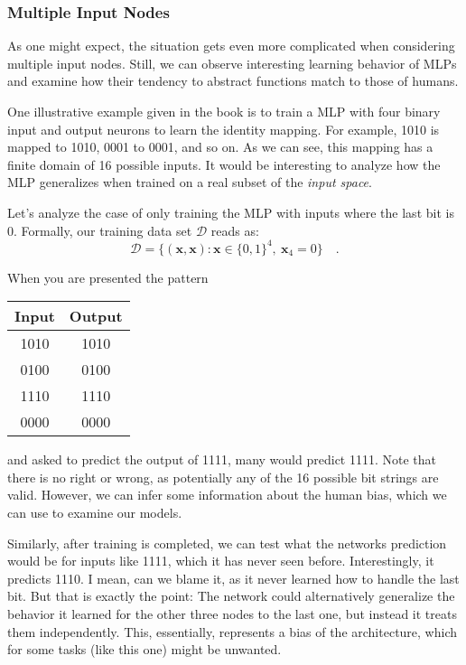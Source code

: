 \documentclass[../../main.tex]{subfiles}
\begin{document}
    \subsubsection{Multiple Input Nodes}
    As one might expect, the situation gets even more complicated when considering multiple input nodes. Still, we can observe interesting learning behavior of MLPs and examine how their tendency to abstract functions match to those of humans.

    One illustrative example given in the book is to train a MLP with four binary input and output neurons to learn the identity mapping. For example, 1010 is mapped to 1010, 0001 to 0001, and so on. As we can see, this mapping has a finite domain of 16 possible inputs. It would be interesting to analyze how the MLP generalizes when trained on a real subset of the \emph{input space}.

    Let's analyze the case of only training the MLP with inputs where the last bit is 0. Formally, our training data set $\mathcal{D}$ reads as:
    \[
        \mathcal{D} = \{ (\bm{x}, \bm{x}): \bm{x} \in \{0, 1\}^4, \ \bm{x}_4 = 0 \} \quad .
    \]

    \begin{example}
        When you are presented the pattern

        \begin{table}[h]
            \centering
            \begin{tabular}{c|c}
                Input & Output \\
                \hline
                1010 & 1010 \\
                0100 & 0100 \\
                1110 & 1110 \\
                0000 & 0000 \\
            \end{tabular}
        \end{table}
        and asked to predict the output of 1111, many would predict 1111. Note that there is no right or wrong, as potentially any of the 16 possible bit strings are valid. However, we can infer some information about the human bias, which we can use to examine our models.
    \end{example}

    Similarly, after training is completed, we can test what the networks prediction would be for inputs like 1111, which it has never seen before. Interestingly, it predicts 1110. I mean, can we blame it, as it never learned how to handle the last bit. But that is exactly the point: The network could alternatively generalize the behavior it learned for the other three nodes to the last one, but instead it treats them independently. This, essentially, represents a bias of the architecture, which for some tasks (like this one) might be unwanted.
\end{document}
